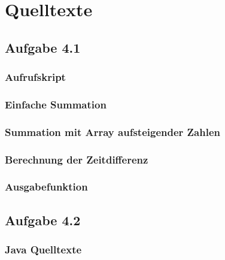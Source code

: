 \documentclass[a4paper,
12pt,
BCOR12mm,
]{scrartcl}
\begin{document}
\section{Quelltexte}
\subsection{Aufgabe 4.1}
\subsubsection{Aufrufskript}
\label{src:call}

 
\subsubsection{Einfache Summation}
\label{src:sum}

\subsubsection{Summation mit Array aufsteigender Zahlen}
\label{src:ascend}


\subsubsection{Berechnung der Zeitdifferenz}
\label{src:messure}



\subsubsection{Ausgabefunktion}
\label{src:basic}


\subsection{Aufgabe 4.2}
\subsubsection{Java Quelltexte}
\label{src:java}



\end{document}
